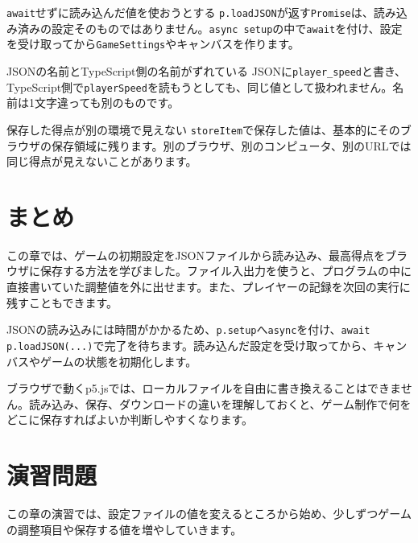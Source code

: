 \begin{mistakebox}{\texttt{await}せずに読み込んだ値を使おうとする}
\texttt{p.loadJSON}が返す\texttt{Promise}は、読み込み済みの設定そのものではありません。\texttt{async setup}の中で\texttt{await}を付け、設定を受け取ってから\texttt{GameSettings}やキャンバスを作ります。
\end{mistakebox}

\begin{mistakebox}{JSONの名前とTypeScript側の名前がずれている}
JSONに\texttt{player\_speed}と書き、TypeScript側で\texttt{playerSpeed}を読もうとしても、同じ値として扱われません。名前は1文字違っても別のものです。
\end{mistakebox}

\begin{mistakebox}{保存した得点が別の環境で見えない}
\texttt{storeItem}で保存した値は、基本的にそのブラウザの保存領域に残ります。別のブラウザ、別のコンピュータ、別のURLでは同じ得点が見えないことがあります。
\end{mistakebox}

\section{まとめ}

この章では、ゲームの初期設定をJSONファイルから読み込み、最高得点をブラウザに保存する方法を学びました。ファイル入出力を使うと、プログラムの中に直接書いていた調整値を外に出せます。また、プレイヤーの記録を次回の実行に残すこともできます。

JSONの読み込みには時間がかかるため、\texttt{p.setup}へ\texttt{async}を付け、\texttt{await p.loadJSON(...)}で完了を待ちます。読み込んだ設定を受け取ってから、キャンバスやゲームの状態を初期化します。

ブラウザで動くp5.jsでは、ローカルファイルを自由に書き換えることはできません。読み込み、保存、ダウンロードの違いを理解しておくと、ゲーム制作で何をどこに保存すればよいか判断しやすくなります。

\section{演習問題}

この章の演習では、設定ファイルの値を変えるところから始め、少しずつゲームの調整項目や保存する値を増やしていきます。

